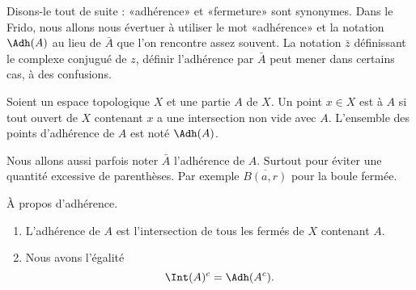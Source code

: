 Disons-le tout de suite : «adhérence» et «fermeture» sont synonymes. Dans le Frido, nous allons nous évertuer à utiliser le mot «adhérence» et la notation \( \Adh(A)\) au lieu de \( \bar A\) que l'on rencontre assez souvent. La notation \( \bar z\) définissant le complexe conjugué de \( z\), définir l'adhérence par \( \bar A\) peut mener dans certains cas, à des confusions.
\begin{definition}      \label{DEFooSVWMooLpAVZR}
	Soient un espace topologique \( X\) et une partie \( A\) de \( X\). Un point \( x\in X\) est  à \( A\) si tout ouvert de \( X\) contenant \( x\) a une intersection non vide avec \( A\). L'ensemble des points d'adhérence de \( A\) est noté $\Adh(A)$.

	Nous allons aussi parfois noter \( \bar A\) l'adhérence de \( A\). Surtout pour éviter une quantité excessive de parenthèses. Par exemple \( \overline{ B(a,r) }\) pour la boule fermée.
\end{definition}

\begin{lemma}       \label{LEMooILNCooOFZaTe}
	À propos d'adhérence.
	\begin{enumerate}
		\item
		      L'adhérence de \( A\) est l'intersection de tous les fermés de \( X\) contenant \( A\).
		\item
		      Nous avons l'égalité
		      \begin{equation}
			      \Int(A)^c = \Adh(A^c).
		      \end{equation}
	\end{enumerate}
\end{lemma}

